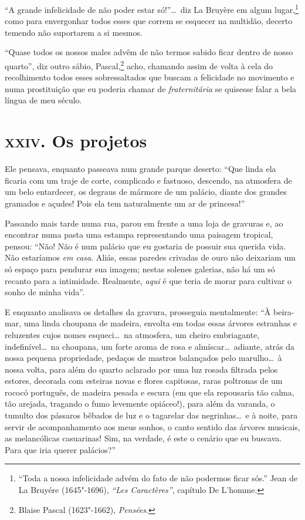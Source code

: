 ``A grande infelicidade de não poder estar
só!''\ldots\  diz La Bruyère em algum lugar,\footnote{``Toda a 
nossa infelicidade advém do fato de não
podermos ficar sós.'' Jean de La Bruyére (1645"-1696),
\textit{``Les Caractères''}, capítulo De L'homme.} como para
envergonhar todos esses que correm se esquecer na
multidão, decerto temendo não suportarem a si mesmos.

``Quase todos os nossos males advêm de não termos sabido
ficar dentro de nosso quarto'', diz outro sábio,
Pascal,\footnote{  Blaise Pascal (1623"-1662), \textit{Pensées}.}
acho, chamando assim de volta à cela do
recolhimento todos esses sobressaltados que buscam a felicidade 
no movimento e numa prostituição que eu poderia chamar de
\textit{fraternitária} se quisesse falar a bela língua de meu século.

\chapter{\textsc{xxiv.} Os projetos}

Ele pensava, enquanto passeava num grande parque deserto:
``Que linda ela ficaria com um traje de corte, complicado
e fastuoso, descendo, na atmosfera de um belo entardecer, os
degraus de mármore de um palácio, diante dos grandes gramados e açudes!
Pois ela tem naturalmente um ar de princesa!''

Passando mais tarde numa rua, parou em frente a uma loja de gravuras
e, ao encontrar numa pasta uma estampa representando uma paisagem
tropical, pensou: ``Não! Não é num palácio que eu gostaria
de possuir sua querida vida. Não estaríamos \textit{em casa}. Aliás, essas
paredes crivadas de ouro não deixariam um só espaço para pendurar sua
imagem; nestas solenes galerias, não há um só recanto para a
intimidade. Realmente, \textit{aqui} é que teria de morar para cultivar
o sonho de minha vida''.

E enquanto analisava os detalhes da gravura, prosseguia mentalmente:
``À beira-mar, uma linda choupana de madeira, envolta
em todas essas árvores estranhas e reluzentes cujos nomes esqueci\ldots\ 
na atmosfera, um cheiro embriagante, indefinível\ldots\  na choupana, um
forte aroma de rosa e almíscar\ldots\  adiante, atrás da nossa
pequena propriedade, pedaços de mastros balançados pelo marulho\ldots\  à nossa volta, para além do quarto aclarado por uma luz rosada filtrada
pelos estores, decorada com esteiras novas e flores capitosas, raras poltronas de um rococó português, de madeira pesada e escura (em
que ela repousaria tão calma, tão arejada, tragando o fumo
levemente opiáceo!), para além da varanda, o tumulto dos pássaros bêbados de
luz e o tagarelar das negrinhas\ldots\  e à noite, para servir de
acompanhamento aos meus sonhos, o canto sentido das árvores musicais,
as melancólicas casuarinas! Sim, na verdade, é este o cenário que eu
buscava. Para que iria querer palácios?''

